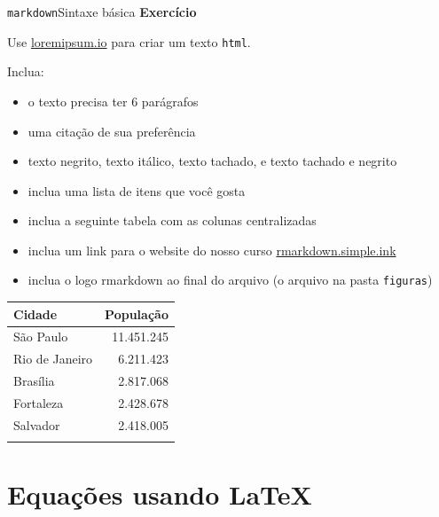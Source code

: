 \documentclass[
  10pt,
  ignorenonframetext,
]{beamer}
\providecommand{\tightlist}{%
  \setlength{\itemsep}{0pt}\setlength{\parskip}{0pt}}\usepackage{longtable,booktabs,array}
\begin{document}
\begin{frame}[fragile]{\texttt{markdown}\newline Sintaxe básica}
\protect\hypertarget{markdownsintaxe-buxe1sica-16}{}
\textbf{Exercício}

\small

Use \href{https://loremipsum.io/}{loremipsum.io} para criar um texto
\texttt{html}.

Inclua:

\begin{itemize}
\tightlist
\item
  o texto precisa ter 6 parágrafos
\item
  uma citação de sua preferência
\item
  texto negrito, texto itálico, texto tachado, e texto tachado e negrito
\item
  inclua uma lista de itens que você gosta
\item
  inclua a seguinte tabela com as colunas centralizadas
\item
  inclua um link para o website do nosso curso
  \href{https://rmarkdown.simple.ink}{rmarkdown.simple.ink}
\item
  inclua o logo rmarkdown ao final do arquivo (o arquivo na pasta
  \texttt{figuras})
\end{itemize}

\begin{longtable}[]{@{}lr@{}}
\toprule\noalign{}
Cidade & População \\
\midrule\noalign{}
\endhead
São Paulo & 11.451.245 \\
Rio de Janeiro & 6.211.423 \\
Brasília & 2.817.068 \\
Fortaleza & 2.428.678 \\
Salvador & 2.418.005 \\
\bottomrule\noalign{}
\end{longtable}

\normalsize
\end{frame}

\hypertarget{equauxe7uxf5es-usando}{%
\section{\texorpdfstring{Equações usando
\LaTeX}{Equações usando }}\label{equauxe7uxf5es-usando}}
\end{document}
